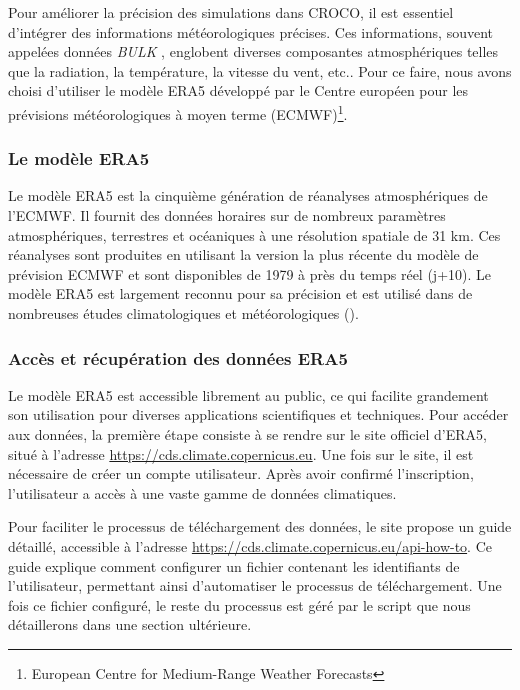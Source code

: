 Pour améliorer la précision des simulations dans CROCO, il est essentiel d'intégrer des informations météorologiques précises. Ces informations, souvent appelées données \og \textit{BULK} \fg{}, englobent diverses composantes atmosphériques telles que la radiation, la température, la vitesse du vent, etc.. Pour ce faire, nous avons choisi d'utiliser le modèle ERA5 développé par le Centre européen pour les prévisions météorologiques à moyen terme (ECMWF)\footnote{\og European Centre for Medium-Range Weather Forecasts\fg{}}.

\subsubsection{Le modèle ERA5}
Le modèle ERA5 est la cinquième génération de réanalyses atmosphériques de l'ECMWF. Il fournit des données horaires sur de nombreux paramètres atmosphériques, terrestres et océaniques à une résolution spatiale de 31 km. Ces réanalyses sont produites en utilisant la version la plus récente du modèle de prévision ECMWF et sont disponibles de 1979 à près du temps réel (j+10). Le modèle ERA5 est largement reconnu pour sa précision et est utilisé dans de nombreuses études climatologiques et météorologiques (\citep{grenier2021modernisation, gatien2023using, delhasse2020brief, levesque2022evaluation, lang2019climate}).


\subsubsection{Accès et récupération des données ERA5}

Le modèle ERA5 est accessible librement au public, ce qui facilite grandement son utilisation pour diverses applications scientifiques et techniques. Pour accéder aux données, la première étape consiste à se rendre sur le site officiel d'ERA5, situé à l'adresse \url{https://cds.climate.copernicus.eu}. Une fois sur le site, il est nécessaire de créer un compte utilisateur. Après avoir confirmé l'inscription, l'utilisateur a accès à une vaste gamme de données climatiques.

Pour faciliter le processus de téléchargement des données, le site propose un guide détaillé, accessible à l'adresse \url{https://cds.climate.copernicus.eu/api-how-to}. Ce guide explique comment configurer un fichier contenant les identifiants de l'utilisateur, permettant ainsi d'automatiser le processus de téléchargement. Une fois ce fichier configuré, le reste du processus est géré par le script que nous détaillerons dans une section ultérieure.

